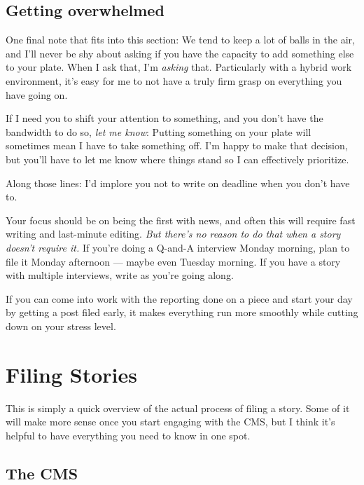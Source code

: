 \documentclass[
  11pt,
  american,
  letterpaperpaper,
  extrafontsizes,onecolumn,openright
  ]{memoir}
\begin{document}
\hypertarget{getting-overwhelmed}{%
\section*{Getting overwhelmed}\label{getting-overwhelmed}}

One final note that fits into this section: We tend to keep a lot of balls in the air, and I'll never be shy about asking if you have the capacity to add something else to your plate. When I ask that, I'm \emph{asking} that. Particularly with a hybrid work environment, it's easy for me to not have a truly firm grasp on everything you have going on.

If I need you to shift your attention to something, and you don't have the bandwidth to do so, \emph{let me know}: Putting something on your plate will sometimes mean I have to take something off. I'm happy to make that decision, but you'll have to let me know where things stand so I can effectively prioritize.

Along those lines: I'd implore you not to write on deadline when you don't have to.

Your focus should be on being the first with news, and often this will require fast writing and last-minute editing. \emph{But there's no reason to do that when a story doesn't require it.} If you're doing a Q-and-A interview Monday morning, plan to file it Monday afternoon --- maybe even Tuesday morning. If you have a story with multiple interviews, write as you're going along.

If you can come into work with the reporting done on a piece and start your day by getting a post filed early, it makes everything run more smoothly while cutting down on your stress level.

\hypertarget{filing-stories}{%
\chapter{Filing Stories}\label{filing-stories}}

This is simply a quick overview of the actual process of filing a story. Some of it will make more sense once you start engaging with the CMS, but I think it's helpful to have everything you need to know in one spot.

\hypertarget{the-cms}{%
\section*{The CMS}\label{the-cms}}
\end{document}
